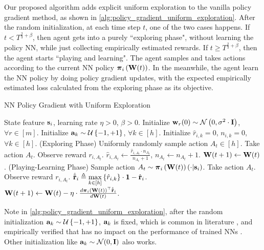 Our proposed algorithm adds explicit uniform exploration to the vanilla policy gradient method, as shown in \cref{alg:policy_gradient_uniform_exploration}. After the random initialization, at each time step $t$, one of the two cases happens. If $t < T^{\frac{2}{3} + \beta}$, then agent gets into a purely ``exploring phase", without learning the policy NN, while just collecting empirically estimated rewards. If $t \ge T^{\frac{2}{3} + \beta}$, then the agent starts ``playing and learning". The agent samples and takes actions according to the current NN policy ${\boldsymbol{\pi}}_{i}\left({\mathbf{W}}(t)\right)$. In the meanwhile, the agent learn the NN policy by doing policy gradient updates, with the expected empirically estimated loss calculated from the exploring phase as its objective.

\begin{algorithm}[t]
   \caption{NN Policy Gradient with Uniform Exploration}
\label{alg:policy_gradient_uniform_exploration}
\begin{algorithmic}
    State feature ${\mathbf{s}}_i$, learning rate $\eta > 0$, $\beta > 0$.
   \STATE Initialize ${\mathbf{w}}_r(0) \sim {\mathcal{N}}\left( 0, \sigma^2 \cdot {\mathbf{I}} \right)$, $\forall r \in [m]$. \STATE Initialize ${\mathbf{a}}_k \sim {\mathcal{U}}\left\{-1, +1\right\}$, $\forall k \in [h]$.
   \STATE Initialize $\hat{r}_{i,k} = 0$, $n_{i,k} = 0$, $\forall k \in [h]$.
   \STATE (Exploring Phase)
   \STATE Uniformly randomly sample action $A_{t} \in [h]$.
   \STATE Take action $A_{t}$.  Observe reward $r_{i, A_{t}}$.
   \STATE $\hat{r}_{i,A_{t}} \leftarrow \frac{\hat{r}_{i,A_{t}} \cdot 
   n_{A_{t}}}{ n_{A_{t}} + 1}$, $n_{A_{t}} \leftarrow n_{A_{t}} + 1$.
   \STATE ${\mathbf{W}}(t+1) \leftarrow {\mathbf{W}}(t)$.
   \ELSE
   \STATE (Playing-Learning Phase)
   \STATE Sample action $A_{t} \sim {\boldsymbol{\pi}}_{i}\left({\mathbf{W}}(t)\right)\left(\cdot \middle| {\mathbf{s}}_i \right)$.
   \STATE Take action $A_{t}$. Observe reward $r_{i, A_{t}}$.
   \STATE $\hat{{\tilde{\mathbf{r}}}}_i \triangleq \max\limits_{k \in [h]}{\left\{ \hat{r}_{i, k} \right\}} \cdot {\mathbf{1}} - {\hat{\mathbf{r}}}_i$.
   \STATE ${\mathbf{W}}(t+1) \leftarrow {\mathbf{W}}(t) - \eta \cdot \frac{d {\boldsymbol{\pi}}_{i}\left({\mathbf{W}}(t)\right)^\top \hat{{\tilde{\mathbf{r}}}}_i}{d {\mathbf{W}}(t)}$.
   \ENDIF
   \ENDFOR
\end{algorithmic}
\end{algorithm}

Note in \cref{alg:policy_gradient_uniform_exploration}, after the random initialization ${\mathbf{a}}_k \sim {\mathcal{U}}\left\{-1, +1\right\}$, ${\mathbf{a}}_k$ is fixed, which is common in literature \citep{li2018learning,du2018gradientA,du2018gradientB,allen2018convergenceA,allen2018convergenceB}, and empirically verified that has no impact on the performance of trained NNs \citep{hoffer2018fix}. Other initialization like ${\mathbf{a}}_k \sim {\mathcal{N}}(0, {\mathbf{I}})$ also works.

